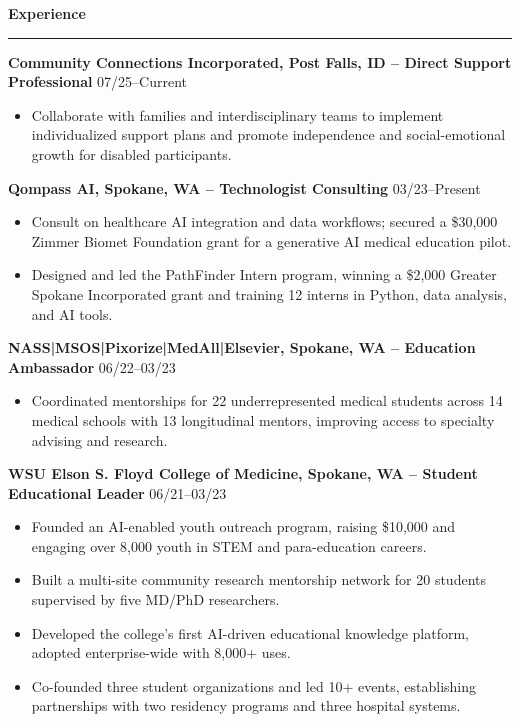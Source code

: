 \documentclass[9pt,a4paper]{article}
\newenvironment{expitemize}{%
  \begin{itemize}[leftmargin=*, topsep=0pt, itemsep=0pt, parsep=0pt, partopsep=0pt]
}{%
  \end{itemize}
}
\newcommand{\sectionline}{%
  \nointerlineskip
  \vspace{0.25em}%
  \hspace*{-\hoffset}\hspace*{-\oddsidemargin}%
  \rule{\dimexpr\textwidth+\hoffset+\oddsidemargin\relax}{0.4pt}%
  \vspace{0.4em}%
}
\newcommand{\centersection}[1]{%
  \vspace{0.6em}%
  \begin{center}
    \large\bfseries #1%
  \end{center}
  \sectionline
}
\begin{document}
\centersection{Experience}

\textbf{Community Connections Incorporated, Post Falls, ID -- Direct Support Professional} \hfill 07/25--Current\\
\begin{itemize}[leftmargin=*]
  \item Collaborate with families and interdisciplinary teams to implement individualized support plans and promote independence and social-emotional growth for disabled participants.
\end{itemize}

\textbf{Qompass AI, Spokane, WA -- Technologist Consulting} \hfill 03/23--Present\\[-0.25\baselineskip]
\begin{expitemize}
  \item Consult on healthcare AI integration and data workflows; secured a \$30{,}000 Zimmer Biomet Foundation grant for a generative AI medical education pilot.
  \item Designed and led the PathFinder Intern program, winning a \$2{,}000 Greater Spokane Incorporated grant and training 12 interns in Python, data analysis, and AI tools.
\end{expitemize}

\textbf{NASS|MSOS|Pixorize|MedAll|Elsevier, Spokane, WA -- Education Ambassador} \hfill 06/22--03/23\\[-0.25\baselineskip]
\begin{expitemize}
  \item Coordinated mentorships for 22 underrepresented medical students across 14 medical schools with 13 longitudinal mentors, improving access to specialty advising and research.
\end{expitemize}

\textbf{WSU Elson S. Floyd College of Medicine, Spokane, WA -- Student Educational Leader} \hfill 06/21--03/23\\[-0.25\baselineskip]
\begin{expitemize}
  \item Founded an AI-enabled youth outreach program, raising \$10{,}000 and engaging over 8{,}000 youth in STEM
    and para-education careers.
  \item Built a multi-site community research mentorship network for 20 students supervised by five MD/PhD researchers.
  \item Developed the college’s first AI-driven educational knowledge platform, adopted enterprise-wide with 8{,}000+ uses.
  \item Co-founded three student organizations and led 10+ events, establishing partnerships with two residency programs and three hospital systems.
\end{expitemize}
\end{document}
